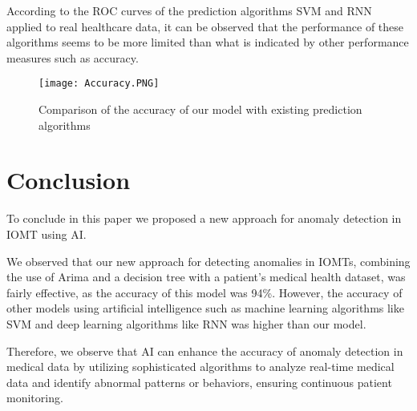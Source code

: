 \documentclass[conference]{IEEEtran}
\begin{document}
According to the ROC curves of the prediction algorithms SVM and RNN applied to real healthcare data, it can be observed that the performance of these algorithms seems to be more limited than what is indicated by other performance measures such as accuracy.

\begin{figure}[htbp]
    \centering
    \texttt{[image: Accuracy.PNG]}
    \caption{Comparison of the accuracy of our model with existing prediction algorithms}
    \label{fig:my_label}
\end{figure}

\section{Conclusion}
To conclude in this paper we proposed a new approach for anomaly detection in IOMT using AI.

We observed that our new approach for detecting anomalies in IOMTs, combining the use of Arima and a decision tree with a patient's medical health dataset, was fairly effective, as the accuracy of this model was 94\%.
However, the accuracy of other models using artificial intelligence such as machine learning algorithms like SVM and deep learning algorithms like RNN was higher than our model.

Therefore, we observe that AI can enhance the accuracy of anomaly detection in medical data by utilizing sophisticated algorithms to analyze real-time medical data and identify abnormal patterns or behaviors, ensuring continuous patient monitoring.
\end{document}
